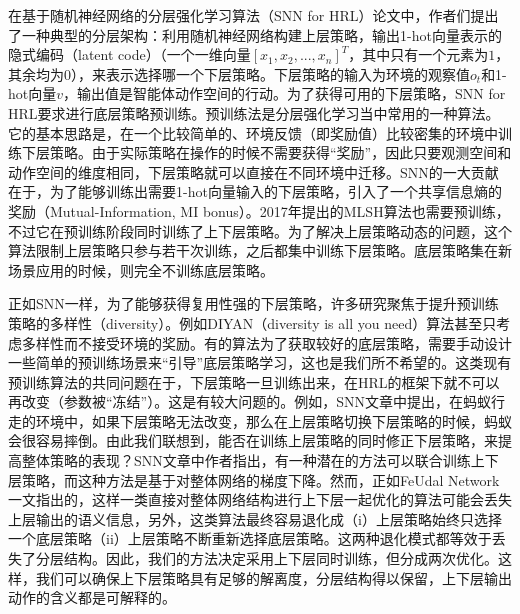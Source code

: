 在基于随机神经网络的分层强化学习算法（SNN for HRL\cite{SNN4hrl}）论文中，作者们提出了一种典型的分层架构：利用随机神经网络构建上层策略，输出1-hot向量表示的隐式编码（latent code）（一个一维向量$[x_1, x_2, ..., x_n]^T$，其中只有一个元素为$1$，其余均为$0$），来表示选择哪一个下层策略。下层策略的输入为环境的观察值$o_t$和1-hot向量$v$，输出值是智能体动作空间的行动。为了获得可用的下层策略，SNN for HRL要求进行底层策略预训练。预训练法是分层强化学习当中常用的一种算法。它的基本思路是，在一个比较简单的、环境反馈（即奖励值）比较密集的环境中训练下层策略。由于实际策略在操作的时候不需要获得``奖励''，因此只要观测空间和动作空间的维度相同，下层策略就可以直接在不同环境中迁移。SNN的一大贡献在于，为了能够训练出需要1-hot向量输入的下层策略，引入了一个共享信息熵的奖励（Mutual-Information, MI bonus）。2017年提出的MLSH算法\cite{MLSH}也需要预训练，不过它在预训练阶段同时训练了上下层策略。为了解决上层策略动态的问题，这个算法限制上层策略只参与若干次训练，之后都集中训练下层策略。底层策略集在新场景应用的时候，则完全不训练底层策略。

正如SNN一样，为了能够获得复用性强的下层策略，许多研究聚焦于提升预训练策略的多样性（diversity）\cite{DIYAN}\cite{Learning_and_Transfer_of_Modulated_Locomotor_Controllers}。例如DIYAN（diversity is all you need）算法甚至只考虑多样性而不接受环境的奖励。有的算法\cite{Learning_and_Transfer_of_Modulated_Locomotor_Controllers}为了获取较好的底层策略，需要手动设计一些简单的预训练场景来``引导''底层策略学习，这也是我们所不希望的。这类现有预训练算法的共同问题在于，下层策略一旦训练出来，在HRL的框架下就不可以再改变（参数被``冻结''）。这是有较大问题的。例如，SNN文章中提出，在蚂蚁行走的环境中，如果下层策略无法改变，那么在上层策略切换下层策略的时候，蚂蚁会很容易摔倒。由此我们联想到，能否在训练上层策略的同时修正下层策略，来提高整体策略的表现？SNN文章中作者指出，有一种潜在的方法可以联合训练上下层策略，而这种方法是基于对整体网络的梯度下降\cite{categorical_gradient}。然而，正如FeUdal Network\cite{feudal}一文指出的，这样一类直接对整体网络结构进行上下层一起优化的算法可能会丢失上层输出的语义信息，另外，这类算法最终容易退化成（i）上层策略始终只选择一个底层策略（ii）上层策略不断重新选择底层策略。这两种退化模式都等效于丢失了分层结构。因此，我们的方法决定采用上下层同时训练，但分成两次优化。这样，我们可以确保上下层策略具有足够的解离度，分层结构得以保留，上下层输出动作的含义都是可解释的。
    
